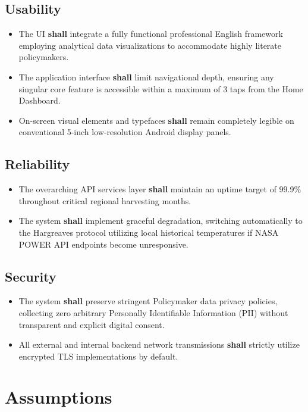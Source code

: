 \subsection{Usability}
\begin{itemize}
    \item The UI \textbf{shall} integrate a fully functional professional English framework employing analytical data visualizations to accommodate highly literate policymakers.
    \item The application interface \textbf{shall} limit navigational depth, ensuring any singular core feature is accessible within a maximum of 3 taps from the Home Dashboard.
    \item On-screen visual elements and typefaces \textbf{shall} remain completely legible on conventional 5-inch low-resolution Android display panels.
\end{itemize}

\subsection{Reliability}
\begin{itemize}
    \item The overarching API services layer \textbf{shall} maintain an uptime target of 99.9\% throughout critical regional harvesting months.
    \item The system \textbf{shall} implement graceful degradation, switching automatically to the Hargreaves protocol utilizing local historical temperatures if NASA POWER API endpoints become unresponsive.
\end{itemize}

\subsection{Security}
\begin{itemize}
    \item The system \textbf{shall} preserve stringent Policymaker data privacy policies, collecting zero arbitrary Personally Identifiable Information (PII) without transparent and explicit digital consent.
    \item All external and internal backend network transmissions \textbf{shall} strictly utilize encrypted TLS implementations by default.
\end{itemize}

\section{Assumptions}

